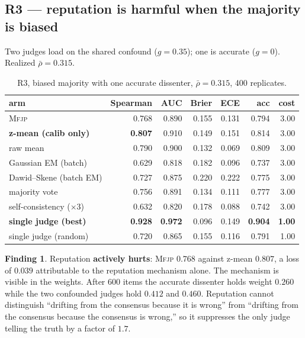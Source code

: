 \documentclass[11pt]{article}
\theoremstyle{definition}
\newtheorem{finding}{Finding}
\newcommand{\rhobar}{\ensuremath{\bar{\rho}}}
\newcommand{\mfjp}{\textsc{Mfjp}}
\begin{document}
\subsection{R3 --- reputation is harmful when the majority is biased}

Two judges load on the shared confound ($g=0.35$); one is accurate ($g=0$). Realized
$\rhobar=0.315$.

\begin{table}[H]\centering
\begin{tabular}{lrrrrrr}
\toprule
arm & Spearman & AUC & Brier & ECE & acc & cost \\
\midrule
\mfjp{}                        & 0.768 & 0.890 & 0.155 & 0.131 & 0.794 & 3.00 \\
\textbf{z-mean (calib only)}   & \textbf{0.807} & 0.910 & 0.149 & 0.151 & 0.814 & 3.00 \\
raw mean                       & 0.790 & 0.900 & 0.132 & 0.069 & 0.809 & 3.00 \\
Gaussian EM (batch)            & 0.629 & 0.818 & 0.182 & 0.096 & 0.737 & 3.00 \\
Dawid--Skene (batch EM)        & 0.727 & 0.875 & 0.220 & 0.222 & 0.775 & 3.00 \\
majority vote                  & 0.756 & 0.891 & 0.134 & 0.111 & 0.777 & 3.00 \\
self-consistency ($\times$3)   & 0.632 & 0.820 & 0.178 & 0.088 & 0.742 & 3.00 \\
\textbf{single judge (best)}   & \textbf{0.928} & \textbf{0.972} & 0.096 & 0.149 & \textbf{0.904} & \textbf{1.00} \\
single judge (random)          & 0.720 & 0.865 & 0.155 & 0.116 & 0.791 & 1.00 \\
\bottomrule
\end{tabular}
\caption{R3, biased majority with one accurate dissenter, $\rhobar=0.315$, 400 replicates.}
\end{table}

\begin{finding}
Reputation \textbf{actively hurts}: \mfjp{} $0.768$ against z-mean $0.807$, a loss of $0.039$
attributable to the reputation mechanism alone. The mechanism is visible in the weights. After
600 items the accurate dissenter holds weight $\mathbf{0.260}$ while the two confounded judges
hold $\mathbf{0.412}$ and $\mathbf{0.460}$. Reputation cannot distinguish ``drifting from the
consensus because it is wrong'' from ``drifting from the consensus because the consensus is
wrong,'' so it suppresses the only judge telling the truth by a factor of $1.7$.
\end{finding}
\end{document}
